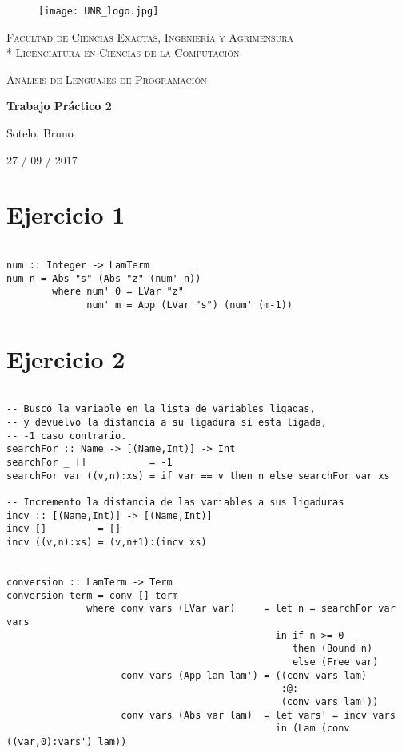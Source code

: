 \documentclass[a4paper]{article}
\begin{document}
\begin{titlepage}
\centering
\begin{figure}[H]
    \begin{center}
        \texttt{[image: UNR\_logo.jpg]}
    \end{center}
\end{figure}
{\scshape\large Facultad de Ciencias Exactas, Ingenier\'ia y Agrimensura\\*
                 Licenciatura en Ciencias de la Computaci\'on\par}
\vspace{3cm}
{\scshape\LARGE An\'alisis de Lenguajes de Programaci\'on\par}
{\huge\bfseries Trabajo Pr\'actico 2\par}
\vspace{3cm}
{\Large Sotelo, Bruno\par}
\vfill
{\large 27 / 09 / 2017 \par}
\end{titlepage}

\section*{Ejercicio 1}
\begin{verbatim}

num :: Integer -> LamTerm
num n = Abs "s" (Abs "z" (num' n))
        where num' 0 = LVar "z"
              num' m = App (LVar "s") (num' (m-1))

\end{verbatim}


\section*{Ejercicio 2}
\begin{verbatim}

-- Busco la variable en la lista de variables ligadas,
-- y devuelvo la distancia a su ligadura si esta ligada,
-- -1 caso contrario.
searchFor :: Name -> [(Name,Int)] -> Int
searchFor _ []           = -1
searchFor var ((v,n):xs) = if var == v then n else searchFor var xs

-- Incremento la distancia de las variables a sus ligaduras
incv :: [(Name,Int)] -> [(Name,Int)]
incv []         = []
incv ((v,n):xs) = (v,n+1):(incv xs)


conversion :: LamTerm -> Term
conversion term = conv [] term
              where conv vars (LVar var)     = let n = searchFor var vars
                                               in if n >= 0
                                                  then (Bound n)
                                                  else (Free var)
                    conv vars (App lam lam') = ((conv vars lam)
                                                :@:
                                                (conv vars lam'))
                    conv vars (Abs var lam)  = let vars' = incv vars
                                               in (Lam (conv ((var,0):vars') lam))

\end{verbatim}
\end{document}
